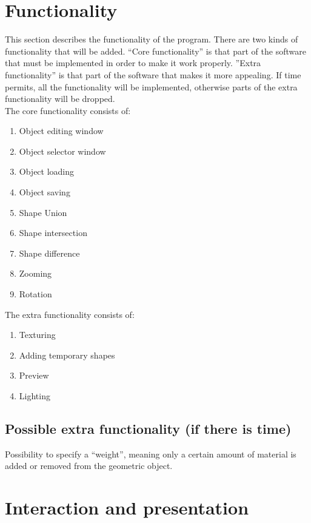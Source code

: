 \documentclass[a4paper,10pt,twoside]{report}
\begin{document}
\section{Functionality}
This section describes the functionality of the program. There are two kinds of functionality that will be added. ``Core functionality'' is that part of the software that must be implemented in order to make it work properly. ''Extra functionality'' is that part of the software that makes it more appealing. If time permits, all the functionality will be implemented, otherwise parts of the extra functionality will be dropped.\\

The core functionality consists of: \\
\vspace{-10pt}
\begin{enumerate}
	\item Object editing window
	\item Object selector window
	\item Object loading
	\item Object saving
	\item Shape Union
	\item Shape intersection
	\item Shape difference
	\item Zooming
	\item Rotation
\end{enumerate}
\bigskip
The extra functionality consists of: \\
\vspace{-10pt}
\begin{enumerate}
	\item Texturing
	\item Adding temporary shapes
	\item Preview
	\item Lighting
\end{enumerate}

\subsection{Possible extra functionality (if there is time)}
Possibility to specify a ``weight'', meaning only a certain amount of material is added or removed from the geometric object.

\section{Interaction and presentation}
\end{document}
